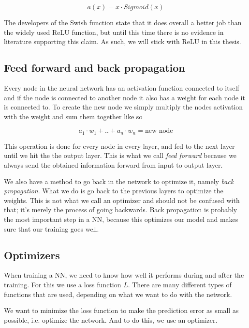 \begin{equation}
    \label{eq:swish}
    a(x) = x \cdot Sigmoid(x)
\end{equation}

The developers of the Swish function state that it does overall a better job than the widely used ReLU function, but until this time there is no evidence in literature supporting this claim. As such, we will stick with ReLU in this thesis. 

\subsection{Feed forward and back propagation} 
Every node in the neural network has an activation function connected to itself and if the node is connected to another node it also has a weight for each node it is connected to. To create the new node we simply multiply the nodes activation with the weight and sum them together like so

\begin{equation}
    a_1 \cdot w_1 + .. + a_n \cdot w_n = \text{new node}
\end{equation}

This operation is done for every node in every layer, and fed to the next layer until we hit the the output layer. This is what we call \textit{feed forward} because we always send the obtained information forward from input to output layer.

We also have a method to go back in the network to optimize it, namely \textit{back propagation}. What we do is go back to the previous layers to optimize the weights. This is not what we call an optimizer and should not be confused with that; it's merely the process of going backwards. Back propagation is probably the most important step in a NN, because this optimizes our model and makes sure that our training goes well. 

\subsection{Optimizers}

When training a NN, we need to know how well it performs during and after the training. For this we use a loss function $L$. There are many different types of functions that are used, depending on what we want to do with the network.

We want to minimize the loss function to make the prediction error as small as possible, i.e. optimize the network. And to do this, we use an optimizer.

